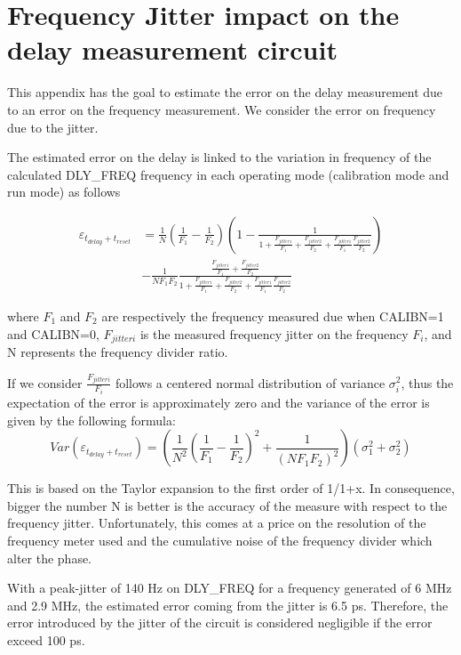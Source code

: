 
\chapter{Frequency Jitter impact on the delay measurement circuit}
\label{app:delay_circuit_jitter}
This appendix has the goal to estimate the error on the delay measurement due to an error on the frequency measurement. We consider the error on frequency due to the jitter.

The estimated error on the delay is linked to the variation in frequency of the calculated DLY\_FREQ frequency in each operating mode (calibration mode and run mode) as follows

\begin{align}
\varepsilon_{t_{delay}+t_{reset}} &= \frac{1}{N} \left(\frac{1}{F_1}-\frac{1}{F_2} \right) \left(1 - \frac{1}{1+\frac{F_{jitter1}}{F_1}+\frac{F_{jitter2}}{F_2}+\frac{F_{jitter1}}{F_1}\frac{F_{jitter2}}{F_2}} \right) \\
&- \frac{1}{NF_1 F_2} \frac{\frac{F_{jitter1}}{F_1}+\frac{F_{jitter2}}{F_2}}{1+\frac{F_{jitter1}}{F_1}+\frac{F_{jitter2}}{F_2}+\frac{F_{jitter1}}{F_1}\frac{F_{jitter2}}{F_2}} \nonumber
\end{align}

where $F_1$ and $F_2$ are respectively the frequency measured due when CALIBN=1 and CALIBN=0, $F_{jitteri}$ is the measured frequency jitter on the frequency $F_i$, and N represents the frequency divider ratio.

If we consider $\frac{F_{jitteri}}{F_i}$ follows a centered normal distribution of variance $\sigma_i^2$, thus the expectation of the error is approximately zero and the variance of the error is given by the following formula:
\begin{equation}
Var\left(\varepsilon_{t_{delay}+t_{reset}}\right) = \left(\frac{1}{N^2} \left(\frac{1}{F_1}-\frac{1}{F_2} \right)^2 + \frac{1}{\left(NF_1F_2\right)^2} \right) \left(\sigma_1^2+\sigma_2^2 \right)
\end{equation}

This is based on the Taylor expansion to the first order of 1/1+x. In consequence, bigger the number N is better is the accuracy of the measure with respect to the frequency jitter. Unfortunately, this comes at a price on the resolution of the frequency meter used and the cumulative noise of the frequency divider which alter the phase.

With a peak-jitter of 140 Hz on DLY\_FREQ for a frequency generated of 6 MHz and 2.9 MHz, the estimated error coming from the jitter is 6.5 ps. Therefore, the error introduced by the jitter of the circuit is considered negligible if the error exceed 100 ps.